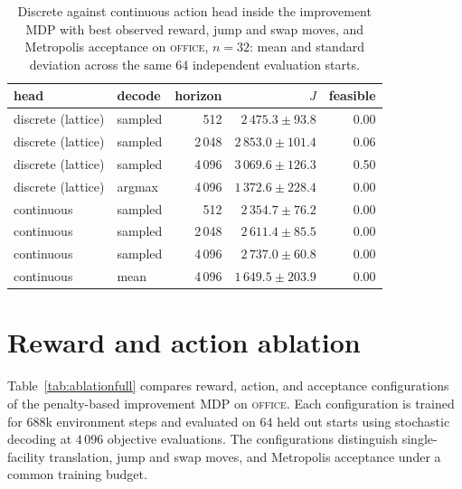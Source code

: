 \documentclass[11pt]{article}
\begin{document}
\begin{table}[htbp]
\centering
\caption{Discrete against continuous action head inside the improvement MDP
with best observed reward, jump and swap moves, and Metropolis acceptance
on \textsc{office}, $n=32$: mean and standard deviation across
the same 64 independent evaluation starts.}
\label{tab:granularity}
\footnotesize
\begin{tabular}{@{}llrrr@{}}
\toprule
head & decode & horizon & $J$ & feasible \\
\midrule
discrete (lattice) & sampled & 512    & $2\,475.3\pm93.8$  & 0.00 \\
discrete (lattice) & sampled & 2\,048 & $2\,853.0\pm101.4$ & 0.06 \\
discrete (lattice) & sampled & 4\,096 & $3\,069.6\pm126.3$ & 0.50 \\
discrete (lattice) & argmax  & 4\,096 & $1\,372.6\pm228.4$ & 0.00 \\
continuous & sampled & 512    & $2\,354.7\pm76.2$  & 0.00 \\
continuous & sampled & 2\,048 & $2\,611.4\pm85.5$  & 0.00 \\
continuous & sampled & 4\,096 & $2\,737.0\pm60.8$  & 0.00 \\
continuous & mean    & 4\,096 & $1\,649.5\pm203.9$ & 0.00 \\
\bottomrule
\end{tabular}
\end{table}

\section{Reward and action ablation}
\label{app:ablation}
Table~\ref{tab:ablationfull} compares reward, action, and acceptance
configurations of the penalty-based improvement MDP on \textsc{office}.
Each configuration is trained for $688$k environment steps and evaluated on
$64$ held out starts using stochastic decoding at $4\,096$ objective
evaluations. The configurations distinguish single-facility translation,
jump and swap moves, and Metropolis acceptance under a common training budget.
\end{document}
